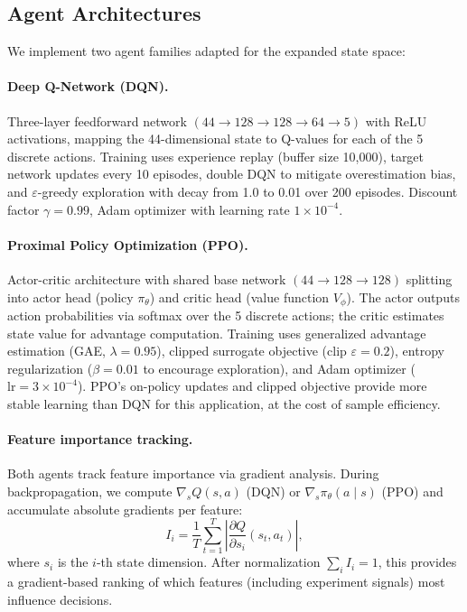 \subsection{Agent Architectures}

We implement two agent families adapted for the expanded state space:

\paragraph{Deep Q-Network (DQN).}
Three-layer feedforward network $(44 \to 128 \to 128 \to 64 \to 5)$ with ReLU activations, mapping the 44-dimensional state to Q-values for each of the 5 discrete actions. Training uses experience replay (buffer size 10,000), target network updates every 10 episodes, double DQN to mitigate overestimation bias, and $\varepsilon$-greedy exploration with decay from 1.0 to 0.01 over 200 episodes. Discount factor $\gamma=0.99$, Adam optimizer with learning rate $1 \times 10^{-4}$.

\paragraph{Proximal Policy Optimization (PPO).}
Actor-critic architecture with shared base network $(44 \to 128 \to 128)$ splitting into actor head (policy $\pi_\theta$) and critic head (value function $V_\phi$). The actor outputs action probabilities via softmax over the 5 discrete actions; the critic estimates state value for advantage computation. Training uses generalized advantage estimation (GAE, $\lambda=0.95$), clipped surrogate objective (clip $\varepsilon=0.2$), entropy regularization ($\beta=0.01$ to encourage exploration), and Adam optimizer ($\text{lr}=3 \times 10^{-4}$). PPO's on-policy updates and clipped objective provide more stable learning than DQN for this application, at the cost of sample efficiency.

\paragraph{Feature importance tracking.}
Both agents track feature importance via gradient analysis. During backpropagation, we compute $\nabla_{s} Q(s, a)$ (DQN) or $\nabla_{s} \pi_\theta(a \mid s)$ (PPO) and accumulate absolute gradients per feature:
\[
I_i = \frac{1}{T} \sum_{t=1}^T \left| \frac{\partial Q}{\partial s_i}(s_t, a_t) \right|,
\]
where $s_i$ is the $i$-th state dimension. After normalization $\sum_i I_i = 1$, this provides a gradient-based ranking of which features (including experiment signals) most influence decisions.

